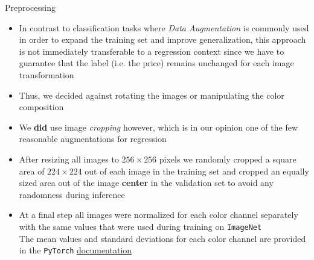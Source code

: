 \documentclass[12pt, letterpaper]{article}
\begin{document}
Preprocessing
\begin{itemize}
    \item In contrast to classification tasks where \emph{Data Augmentation} is commonly used in order to expand the training set and improve generalization, this approach is not immediately transferable to a regression context since we have to guarantee that the label (i.e. the price) remains unchanged for each image transformation
    \item Thus, we decided against rotating the images or manipulating the color composition
    \item We \textbf{did} use image \emph{cropping} however, which is in our opinion one of the few reasonable augmentations for regression
    \item After resizing all images to $256 \times 256$ pixels we randomly cropped a square area of $224 \times 224$ out of each image in the training set and cropped an equally sized area out of the image \textbf{center} in the validation set to avoid any randomness during inference
    \item At a final step all images were normalized for each color channel separately with the same values that were used during training on \texttt{ImageNet} \\
          The mean values and standard deviations for each color channel are provided in the \texttt{PyTorch} \href{https://pytorch.org/vision/stable/models.html}{documentation}
\end{itemize}
\end{document}
